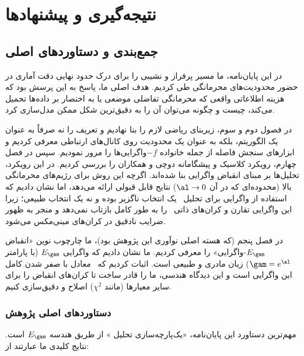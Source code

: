 \chapter{نتیجه‌گیری و پیشنهادها}
\label{ch:conclusion}

\section{جمع‌بندی و دستاوردهای اصلی}
\label{sec:conclusion:summary}

در این پایان‌نامه، ما مسیر پرفراز و نشیبی را برای درک حدود نهایی دقت آماری در حضور محدودیت‌های محرمانگی طی کردیم. هدف اصلی ما، پاسخ به این پرسش بود که هزینه اطلاعاتی واقعی که محرمانگی تفاضلی موضعی یا به اختصار  بر داده‌ها تحمیل می‌کند، چیست و چگونه می‌توان آن را به دقیق‌ترین شکل ممکن مدل‌سازی کرد.

در فصول دوم و سوم، زیربنای ریاضی لازم را بنا نهادیم و تعریف  را نه صرفاً به عنوان یک الگوریتم، بلکه به عنوان یک محدودیت روی کانال‌های ارتباطی معرفی کردیم و ابزارهای سنجش فاصله از جمله خانواده $-f$واگرایی‌ها را مرور نمودیم. سپس در فصل چهارم، رویکرد کلاسیک و پیشگامانه دوچی و همکاران \cite{duchi2018} را بررسی کردیم. در این رویکرد، تحلیل‌ها بر مبنای انقباض واگرایی  بنا شده‌اند. اگرچه این روش برای رژیم‌های محرمانگی بالا (محدوده‌ای که در آن $\al \to 0$) نتایج قابل قبولی ارائه می‌دهد، اما نشان دادیم که استفاده از واگرایی  برای تحلیل \LDP\ یک انتخاب ناگزیر بوده و نه یک انتخاب طبیعی؛ زیرا این واگرایی تقارن و کران‌های ذاتی \LDP\ را به طور کامل بازتاب نمی‌دهد و منجر به ظهور ضرایب نادقیق در کران‌های مینی‌مکس می‌شود.


در فصل پنجم (که هسته اصلی نوآوری این پژوهش بود)، ما چارچوب نوین «انقباض $E_\gam$-واگرایی» را معرفی کردیم. ما نشان دادیم که واگرایی $E_\gam$ (با پارامتر $\gam = e^\al$) زبان مادری و طبیعی  است. اثبات کردیم که \LDP\ معادل با صفر شدن کامل این واگرایی است و این دیدگاه هندسی، ما را قادر ساخت تا کران‌های انقباض را برای سایر معیارها (مانند $\chi^2$) اصلاح و دقیق‌سازی کنیم.

\subsection{دستاوردهای اصلی پژوهش}
مهم‌ترین دستاورد این پایان‌نامه، «یک‌پارچه‌سازی تحلیل » از طریق هندسه $E_\gam$ است. نتایج کلیدی ما عبارتند از:

